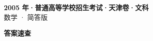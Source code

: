 \documentclass[zihao=-4, a4paper]{ctexart}
\begin{document}
\begin{center}
  {\Large\bfseries 2005 年·普通高等学校招生考试·天津卷·文科}\\[4pt]
  {\large 数学 · 简答版}
\end{center}
\medskip
{}

\clearpage
{}
\begin{center}{\Large\bfseries 答案速查}\end{center}
\medskip

\end{document}
